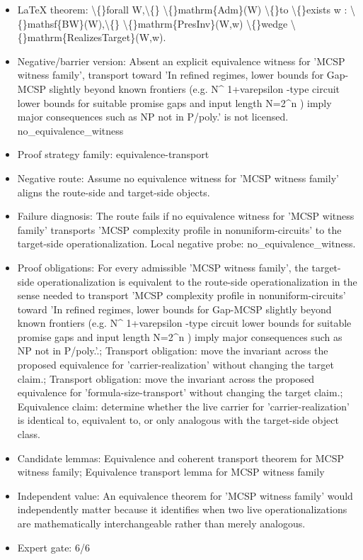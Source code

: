 \documentclass[11pt]{article}
\begin{document}
\begin{itemize}
\item LaTeX theorem: \textbackslash\{\}forall W,\textbackslash\{\} \textbackslash\{\}mathrm\{Adm\}(W) \textbackslash\{\}to \textbackslash\{\}exists w : \textbackslash\{\}mathsf\{BW\}(W),\textbackslash\{\} \textbackslash\{\}mathrm\{PresInv\}(W,w) \textbackslash\{\}wedge \textbackslash\{\}mathrm\{RealizesTarget\}(W,w).
\item Negative/barrier version: Absent an explicit equivalence witness for 'MCSP witness family', transport toward 'In refined regimes, lower bounds for Gap-MCSP slightly beyond known frontiers (e.g. N\textasciicircum{} 1+varepsilon -type circuit lower bounds for suitable promise gaps and input length N=2\textasciicircum{}n ) imply major consequences such as NP not in P/poly.' is not licensed. no\_equivalence\_witness
\item Proof strategy family: equivalence-transport
\item Negative route: Assume no equivalence witness for 'MCSP witness family' aligns the route-side and target-side objects.
\item Failure diagnosis: The route fails if no equivalence witness for 'MCSP witness family' transports 'MCSP complexity profile in nonuniform-circuits' to the target-side operationalization. Local negative probe: no\_equivalence\_witness.
\item Proof obligations: For every admissible 'MCSP witness family', the target-side operationalization is equivalent to the route-side operationalization in the sense needed to transport 'MCSP complexity profile in nonuniform-circuits' toward 'In refined regimes, lower bounds for Gap-MCSP slightly beyond known frontiers (e.g. N\textasciicircum{} 1+varepsilon -type circuit lower bounds for suitable promise gaps and input length N=2\textasciicircum{}n ) imply major consequences such as NP not in P/poly.'.; Transport obligation: move the invariant across the proposed equivalence for 'carrier-realization' without changing the target claim.; Transport obligation: move the invariant across the proposed equivalence for 'formula-size-transport' without changing the target claim.; Equivalence claim: determine whether the live carrier for 'carrier-realization' is identical to, equivalent to, or only analogous with the target-side object class.
\item Candidate lemmas: Equivalence and coherent transport theorem for MCSP witness family; Equivalence transport lemma for MCSP witness family
\item Independent value: An equivalence theorem for 'MCSP witness family' would independently matter because it identifies when two live operationalizations are mathematically interchangeable rather than merely analogous.
\item Expert gate: 6/6
\end{itemize}
\end{document}
